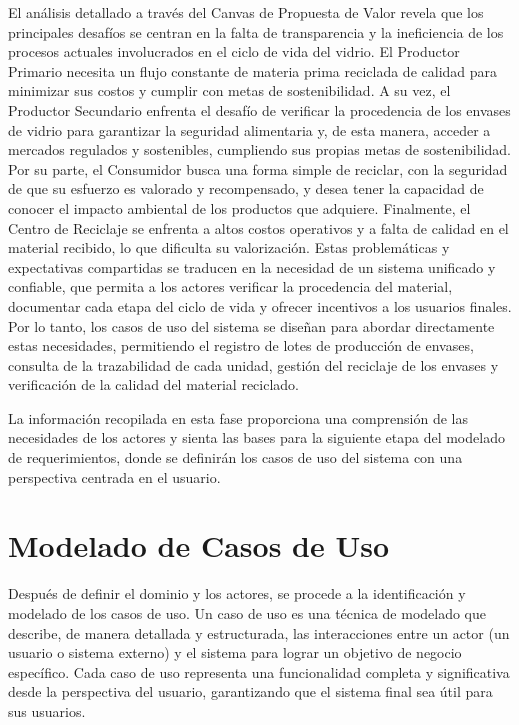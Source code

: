 El análisis detallado a través del Canvas de Propuesta de Valor revela que los principales desafíos se centran en la falta de transparencia y la ineficiencia de los procesos actuales involucrados en el ciclo de vida del vidrio. El Productor Primario necesita un flujo constante de materia prima reciclada de calidad para minimizar sus costos y cumplir con metas de sostenibilidad. A su vez, el Productor Secundario enfrenta el desafío de verificar la procedencia de los envases de vidrio para garantizar la seguridad alimentaria y, de esta manera, acceder a mercados regulados y sostenibles, cumpliendo sus propias metas de sostenibilidad. Por su parte, el Consumidor busca una forma simple de reciclar, con la seguridad de que su esfuerzo es valorado y recompensado, y desea tener la capacidad de conocer el impacto ambiental de los productos que adquiere. Finalmente, el Centro de Reciclaje se enfrenta a altos costos operativos y a falta de calidad en el material recibido, lo que dificulta su valorización. Estas problemáticas y expectativas compartidas se traducen en la necesidad de un sistema unificado y confiable, que permita a los actores verificar la procedencia del material, documentar cada etapa del ciclo de vida y ofrecer incentivos a los usuarios finales. Por lo tanto, los casos de uso del sistema se diseñan para abordar directamente estas necesidades, permitiendo el registro de lotes de producción de envases, consulta de la trazabilidad de cada unidad, gestión del reciclaje de los envases y verificación de la calidad del material reciclado.


La información recopilada en esta fase proporciona una comprensión de las necesidades de los actores y sienta las bases para la siguiente etapa del modelado de requerimientos, donde se definirán los casos de uso del sistema con una perspectiva centrada en el usuario.

\section{Modelado de Casos de Uso}
\label{sec:use-cases}

Después de definir el dominio y los actores, se procede a la identificación y modelado de los casos de uso. Un caso de uso es una técnica de modelado que describe, de manera detallada y estructurada, las interacciones entre un actor (un usuario o sistema externo) y el sistema para lograr un objetivo de negocio específico. Cada caso de uso representa una funcionalidad completa y significativa desde la perspectiva del usuario, garantizando que el sistema final sea útil para sus usuarios.

